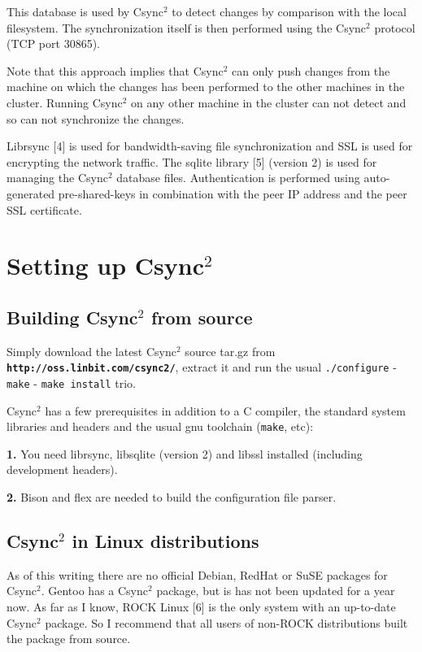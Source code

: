 \documentclass[a4paper,twocolumn]{article}
\def\csync2{{\sc Csync$^{2}$}}
\begin{document}
This database is used by \csync2 to detect changes by comparison with the local
filesystem. The synchronization itself is then performed using the \csync2
protocol (TCP port 30865).

Note that this approach implies that \csync2 can only push changes from the
machine on which the changes has been performed to the other machines in the
cluster. Running \csync2 on any other machine in the cluster can not detect and
so can not synchronize the changes.

Librsync [4] is used for bandwidth-saving file synchronization and SSL is used for
encrypting the network traffic. The sqlite library [5] (version 2) is used for
managing the \csync2 database files. Authentication is performed using
auto-generated pre-shared-keys in combination with the peer IP address and
the peer SSL certificate.

\section{Setting up \csync2}

\subsection{Building \csync2 from source}

Simply download the latest \csync2 source tar.gz from {\bf \tt http://oss.linbit.com/csync2/},
extract it and run the usual {\tt ./configure} - {\tt make} - {\tt make install} trio.

\csync2 has a few prerequisites in addition to a C compiler, the standard
system libraries and headers and the usual gnu toolchain ({\tt make}, etc):

{\bf 1.} You need librsync, libsqlite (version 2) and libssl installed
(including development headers).

{\bf 2.} Bison and flex are needed to build the configuration file parser.

\subsection{\csync2 in Linux distributions}

As of this writing there are no official Debian, RedHat or SuSE packages for
\csync2. Gentoo has a \csync2 package, but is has not been updated for a year
now. As far as I know, ROCK Linux [6] is the only system with an up-to-date
\csync2 package. So I recommend that all users of non-ROCK distributions built
the package from source.
\end{document}
